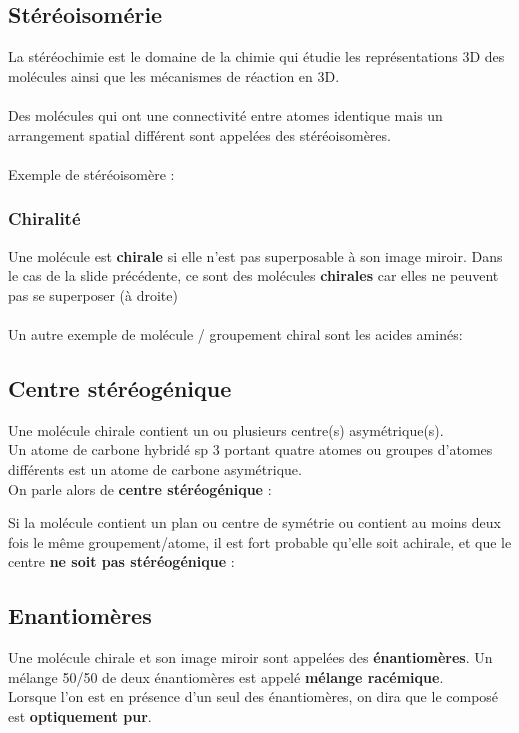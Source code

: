 \documentclass{article}
\newcommand{\insertslide}[2]{
\begin{center}
    \fbox{\texttt{[image: \#1]}}
\end{center}
}
\begin{document}
    \subsection{Stéréoisomérie}
        La stéréochimie est le domaine de la
        chimie qui étudie les représentations 3D
        des molécules ainsi que les mécanismes
        de réaction en 3D.\\\\
        Des molécules qui ont une connectivité
        entre atomes identique mais un
        arrangement spatial différent sont
        appelées des stéréoisomères.\\\\
        Exemple de stéréoisomère :
        \insertslide{Slides/CM2.pdf}{7}
        
        \subsubsection{Chiralité}
            Une molécule est \textbf{chirale} si elle n'est pas
            superposable à son image miroir.
            Dans le cas de la slide précédente, ce sont des molécules \textbf{chirales}
            car elles ne peuvent pas se superposer (à droite)\\\\
            Un autre exemple de molécule / groupement chiral sont les acides aminés:\\
            \insertslide{Slides/CM2.pdf}{10}

    \subsection{Centre stéréogénique}
        Une molécule chirale contient un ou plusieurs
        centre(s) asymétrique(s).\\
        Un atome de carbone hybridé sp 3 portant
        quatre atomes ou groupes d'atomes différents
        est un atome de carbone asymétrique.\\
        On parle alors de \textbf{centre stéréogénique} :
        \insertslide{Slides/CM2.pdf}{16}
        Si la molécule contient un plan ou centre de symétrie ou contient au moins deux fois le
        même groupement/atome, il est fort probable qu'elle soit achirale, et que le centre
        \textbf{ne soit pas stéréogénique} :
        \insertslide{Slides/CM2.pdf}{13}

    \subsection{Enantiomères}
    Une molécule chirale et son image miroir sont
    appelées des \textbf{énantiomères}.
    Un mélange 50/50 de deux énantiomères est
    appelé \textbf{mélange racémique}.\\
    Lorsque l'on est en présence d'un seul des énantiomères, on
    dira que le composé est \textbf{optiquement pur}.
\end{document}
